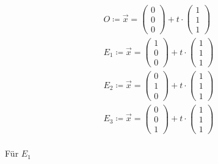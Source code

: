 \begin{gather}
O\coloneqq \vec{x}=\begin{pmatrix}
0\\0\\0
\end{pmatrix} +t\cdot\begin{pmatrix}
1\\1\\1
\end{pmatrix}\\
E_1\coloneqq \vec{x}=\begin{pmatrix}
1\\0\\0
\end{pmatrix} +t\cdot\begin{pmatrix}
1\\1\\1
\end{pmatrix}\\
E_2\coloneqq \vec{x}=\begin{pmatrix}
0\\1\\0
\end{pmatrix} +t\cdot\begin{pmatrix}
1\\1\\1
\end{pmatrix}\\
E_3\coloneqq \vec{x}=\begin{pmatrix}
0\\0\\1
\end{pmatrix} +t\cdot\begin{pmatrix}
1\\1\\1
\end{pmatrix}
\end{gather}\\

Für \ensuremath{E_1}  %

